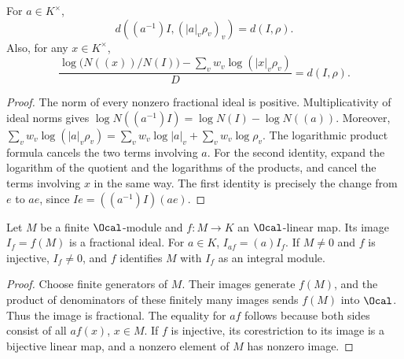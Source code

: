 \begin{lemma}
\label{lem:line-degree-section-independence}
\leanok
For $a\in K^\times$,
\[
 d((a^{-1})I,(|a|_v\rho_v)_v)=d(I,\rho).
\]
Also, for any $x\in K^\times$,
\[
 \frac{\log\bigl(N((x))/N(I)\bigr)
       -\sum_v w_v\log(|x|_v\rho_v)}{D}=d(I,\rho).
\]
\end{lemma}
\begin{proof}
The norm of every nonzero fractional ideal is positive. Multiplicativity
of ideal norms gives
$\log N((a^{-1})I)=\log N(I)-\log N((a))$.
Moreover,
$\sum_v w_v\log(|a|_v\rho_v)
 =\sum_v w_v\log|a|_v+\sum_v w_v\log\rho_v$.
The logarithmic product formula cancels the two terms involving $a$.
For the second identity, expand the logarithm of the quotient and the
logarithms of the products, and cancel the terms involving $x$ in the
same way. The first identity is precisely the change from $e$ to $ae$,
since $Ie=((a^{-1})I)(ae)$.
\end{proof}

\begin{lemma}
\label{lem:line-coordinate-ideal}
\leanok
Let $M$ be a finite $\Ocal$-module and $f:M\to K$ an $\Ocal$-linear map.
Its image $I_f=f(M)$ is a fractional ideal. For $a\in K$,
$I_{af}=(a)I_f$. If $M\ne0$ and $f$ is injective, $I_f\ne0$, and
$f$ identifies $M$ with $I_f$ as an integral module.
\end{lemma}
\begin{proof}
Choose finite generators of $M$. Their images generate $f(M)$, and the
product of denominators of these finitely many images sends $f(M)$ into
$\Ocal$. Thus the image is fractional. The equality for $af$ follows
because both sides consist of all $af(x)$, $x\in M$. If $f$ is injective,
its corestriction to its image is a bijective linear map, and a nonzero
element of $M$ has nonzero image.
\end{proof}

